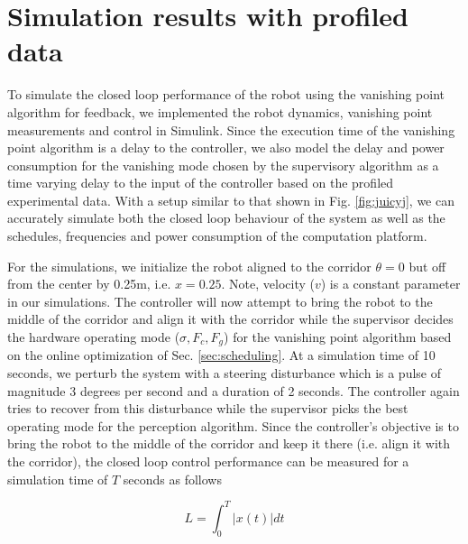 \section{Simulation results with profiled data}
\label{sec:simResults}

To simulate the closed loop performance of the robot using the vanishing point algorithm for feedback, we implemented the robot dynamics, vanishing point measurements and control in Simulink. Since the execution time of the vanishing point algorithm is a delay to the controller, we also model the delay and power consumption for the vanishing mode chosen by the supervisory algorithm as a time varying delay to the input of the controller based on the profiled experimental data. With a setup similar to that shown in Fig. \ref{fig:juicyj}, we can accurately simulate both the closed loop behaviour of the system as well as the schedules, frequencies and power consumption of the computation platform.

For the simulations, we initialize the robot aligned to the corridor $\theta=0$ but off from the center by 0.25m, i.e. $x=0.25$. Note, velocity ($v$) is a constant parameter in our simulations. The controller will now attempt to bring the robot to the middle of the corridor and align it with the corridor while the supervisor decides the hardware operating mode ($\sigma,F_c,F_g$) for the vanishing point algorithm based on the online optimization of Sec. \ref{sec:scheduling}. At a simulation time of 10 seconds, we perturb the system with a steering disturbance which is a pulse of magnitude 3 degrees per second and a duration of 2 seconds. The controller again tries to recover from this disturbance while the supervisor picks the best operating mode for the perception algorithm. Since the controller's objective is to bring the robot to the middle of the corridor and keep it there (i.e. align it with the corridor), the closed loop control performance can be measured for a simulation time of $T$ seconds as follows

\begin{equation}
L = \int_0^T |x(t)|dt
\label{eq:ControlPerf}
\end{equation}

